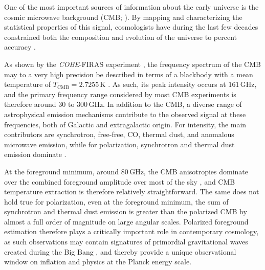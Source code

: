 \documentclass[twocolumn]{aa}
\def\COBE{\textit{COBE}}
\newcommand{\?}[1]{\textcolor{red}{{\bf [#1]}}}
\begin{document}
One of the most important sources of information about the early universe is the
cosmic microwave background (CMB; \citealp{penzias:1965}). By mapping and
characterizing the statistical properties of this signal, cosmologists have
during the last few decades constrained both the composition and evolution of
the universe to percent accuracy \citep[e.g.,][]{bennett2012,planck2016-l01}.

As shown by the \COBE-FIRAS experiment \citep{mather:1994}, the frequency
spectrum of the CMB may to a very high precision be described in terms of a
blackbody with a mean temperature of $T_{\mathrm{CMB}}=2.7255\,\mathrm{K}$
\citep{fixsen2009}. As such, its peak intensity occurs at $161\,\mathrm{GHz}$,
and the primary frequency range considered by most CMB experiments is therefore
around 30 to 300\,GHz. In addition to the CMB, a diverse range of astrophysical
emission mechanisms contribute to the observed signal at these frequencies, both
of Galactic and extragalactic origin. For intensity, the main contributors
are synchrotron, free-free, CO, thermal dust, and anomalous microwave emission,
while for polarization, synchrotron and thermal dust emission dominate
\citep[e.g.,][and references therein]{bennett2012,planck2016-l04}.

At the foreground minimum, around 80\,GHz, the CMB anisotropies dominate over
the combined foreground amplitude over most of the sky \citep{planck2014-a10},
and CMB temperature extraction is therefore relatively straightforward. The same
does not hold true for polarization, even at the foreground minimum, the sum of
synchrotron and thermal dust emission is greater than the polarized CMB by
almost a full order of magnitude on large angular scales. Polarized foreground
estimation therefore plays a critically important role in contemporary
cosmology, as such observations may contain signatures of primordial
gravitational waves created during the Big Bang \citep[e.g.,][and references
therein]{kamionkowski:2016}, and thereby provide a unique observational window
on inflation and physics at the Planck energy scale.
  
\end{document}
